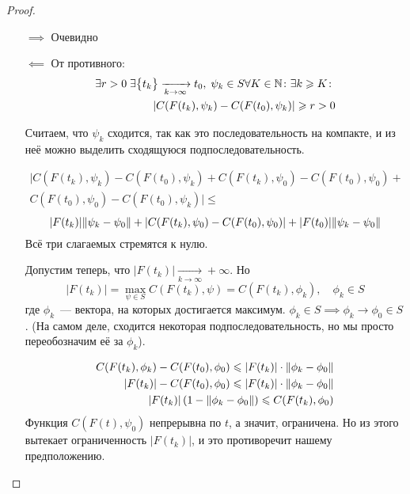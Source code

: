 \begin{proof}
    \begin{itemize}
        \item[$\implies$] Очевидно
        \item[$\impliedby$] От противного:
        \begin{align}
            \exists r > 0\; \exists \bigl\{ t_k \bigr\} \xrightarrow[k \to \infty]{} t_0, \; \psi_k \in S \forall K \in \mathbb{N}\colon \exists k \geqslant K\colon\\
            |C(F(t_k), \psi_k) - C(F(t_0), \psi_k)| \geqslant r > 0
        \end{align} 

        Считаем, что $\psi_k$ сходится, так как это последовательность на компакте, и из неё можно выделить сходящуюся подпоследовательность.
        
        \begin{multline*}
            |C(F(t_k), \psi_k) - C(F(t_0), \psi_k) + C(F(t_k), \psi_0) - C(F(t_0), \psi_0) + \\
            C(F(t_0), \psi_0) - C(F(t_0), \psi_k)| \leqslant
        \end{multline*}
        \begin{equation*}
            |F(t_k)| \lVert \psi_k - \psi_0 \rVert + |C(F(t_k), \psi_0) - C(F(t_0), \psi_0)| + |F(t_0)| \lVert \psi_k - \psi_0 \rVert
        \end{equation*}
        Всё три слагаемых стремятся к нулю.

        Допустим теперь, что $|F(t_k)| \xrightarrow[k \to \infty]{} +\infty$.
        Но 
        \begin{equation*}
            |F(t_k)| = \max\limits_{\psi \in S} C(F(t_k), \psi) = 
            C(F(t_k), \phi_k), \quad \phi_k \in S
        \end{equation*}
        где $\phi_k$~--- вектора, на которых достигается максимум.
        $\phi_k \in S \implies \phi_k \to \phi_0 \in S$.
        (На самом деле, сходится некоторая подпоследовательность, но мы просто переобозначим её за $\phi_k$).

        \begin{align*}
            C(F(t_k), \phi_k) - C(F(t_0), \phi_0) \leqslant |F(t_k)| \cdot \lVert \phi_k - \phi_0 \rVert \\
            |F(t_k)| - C(F(t_0), \phi_0) \leqslant |F(t_k)| \cdot \lVert \phi_k - \phi_0 \rVert \\
            |F(t_k)|\left( 1 - \lVert \phi_k - \phi_0 \rVert  \right) \leqslant C(F(t_k), \phi_0)  
        \end{align*}
        Функция $C(F(t), \psi_0)$ непрерывна по $t$, а значит, ограничена.
        Но из этого вытекает ограниченность $|F(t_k)|$, и это противоречит нашему предположению.
    \end{itemize}
\end{proof}

